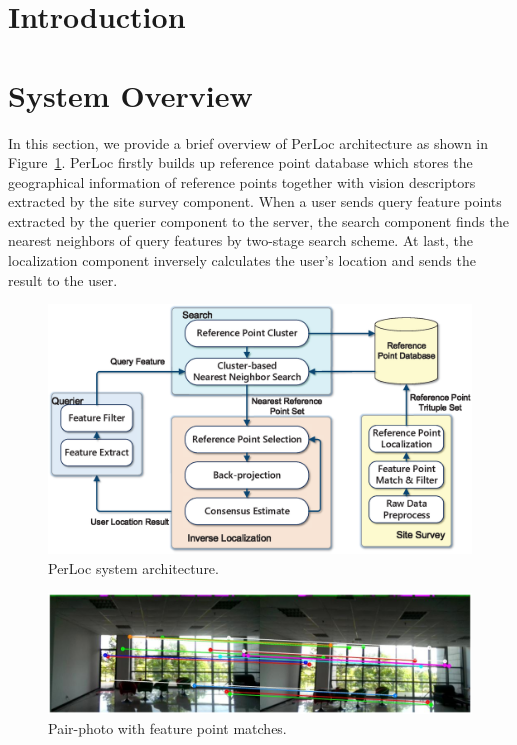 \documentclass[10pt, conference, letterpaper]{IEEEtran}
\def\oursystem{\xspace{PerLoc}\xspace}
\begin{document}
\section{Introduction}
\label{sec:introduction}


\section{System Overview}
\label{sec:over}
%
In this section, we provide a brief overview of \oursystem architecture as shown in Figure~\ref{overview}. \oursystem firstly builds up reference point database which stores the geographical information of reference points together with vision descriptors extracted by the site survey component. When a user sends query feature points extracted by the querier component to the server, the search component finds the nearest neighbors of query features by two-stage search scheme. At last, the localization component inversely calculates the user's location and sends the result to the user.
\begin{figure}[!ht]
\centering
\includegraphics[width=1\linewidth, clip,keepaspectratio]{overview2.eps}
\caption{\oursystem system architecture.}\label{overview}
\end{figure}
\begin{figure}[t!]
\centering
\includegraphics[width=1\linewidth, clip,keepaspectratio]{pair_photo.eps}
\caption{Pair-photo with feature point matches.}\label{pair}
\end{figure}
\end{document}
